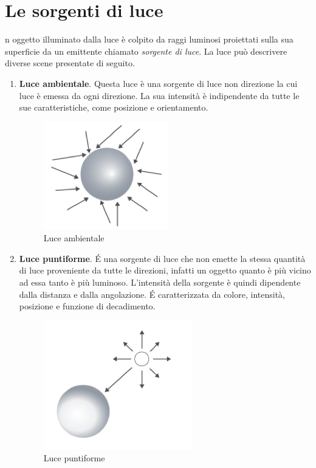 \documentclass[9pt,a4paper,twoside]{tau}
\begin{document}
\section{Le sorgenti di luce}
n oggetto illuminato dalla luce è colpito da raggi luminosi proiettati sulla sua superficie da un emittente chiamato \textit{sorgente di luce}. La luce può descrivere diverse scene presentate di seguito.
\begin{enumerate}
    	\item \textbf{Luce ambientale}. Questa luce è una sorgente di luce non direzione la cui luce è emessa da ogni direzione. La sua intensità è indipendente da tutte le sue caratteristiche, come posizione e orientamento.
    		\begin{figure}[H]
        		\centering
       			\includegraphics[width=0.6\columnwidth]{Figures/01.png}
       	 		\caption{Luce ambientale}
        		\label{fig:figure}
			\end{figure}
		
    	\item \textbf{Luce puntiforme}. \'E una sorgente di luce che non emette la stessa quantità di luce proveniente da tutte le direzioni, infatti un oggetto quanto è più vicino ad essa tanto è più luminoso. L'intensità della sorgente è quindi dipendente dalla distanza e dalla angolazione. \'E caratterizzata da colore, intensità, posizione e funzione di decadimento.
    		\begin{figure}[H]
        		\centering
        		\includegraphics[width=0.6\columnwidth]{Figures/02.png}
        		\caption{Luce puntiforme}
       			\label{fig:figure}
			\end{figure}   
    	

\end{enumerate}
\end{document}
